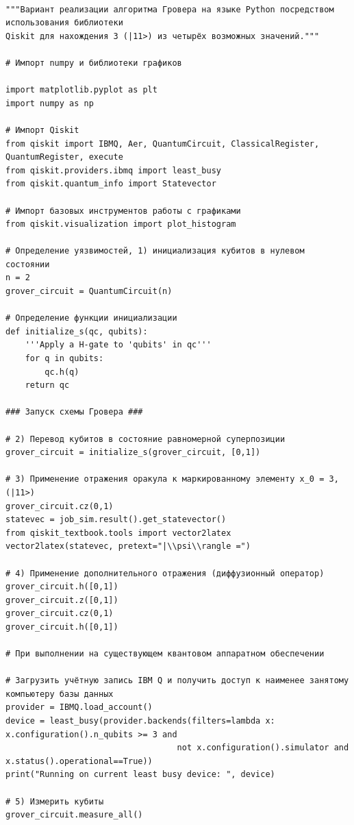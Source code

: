 \documentclass{mrl}
\begin{document}
\begin{verbatim}

"""Вариант реализации алгоритма Гровера на языке Python посредством использования библиотеки
Qiskit для нахождения 3 (|11>) из четырёх возможных значений."""

# Импорт numpy и библиотеки графиков

import matplotlib.pyplot as plt
import numpy as np

# Импорт Qiskit
from qiskit import IBMQ, Aer, QuantumCircuit, ClassicalRegister, QuantumRegister, execute
from qiskit.providers.ibmq import least_busy
from qiskit.quantum_info import Statevector

# Импорт базовых инструментов работы с графиками
from qiskit.visualization import plot_histogram

# Определение уязвимостей, 1) инициализация кубитов в нулевом состоянии
n = 2
grover_circuit = QuantumCircuit(n)

# Определение функции инициализации
def initialize_s(qc, qubits):
    '''Apply a H-gate to 'qubits' in qc'''
    for q in qubits:
        qc.h(q)
    return qc

### Запуск схемы Гровера ###

# 2) Перевод кубитов в состояние равномерной суперпозиции
grover_circuit = initialize_s(grover_circuit, [0,1])

# 3) Применение отражения оракула к маркированному элементу x_0 = 3, (|11>) 
grover_circuit.cz(0,1)
statevec = job_sim.result().get_statevector()
from qiskit_textbook.tools import vector2latex
vector2latex(statevec, pretext="|\\psi\\rangle =")

# 4) Применение дополнительного отражения (диффузионный оператор)
grover_circuit.h([0,1])
grover_circuit.z([0,1])
grover_circuit.cz(0,1)
grover_circuit.h([0,1])

# При выполнении на существующем квантовом аппаратном обеспечении

# Загрузить учётную запись IBM Q и получить доступ к наименее занятому компьютеру базы данных
provider = IBMQ.load_account()
device = least_busy(provider.backends(filters=lambda x: x.configuration().n_qubits >= 3 and 
                                   not x.configuration().simulator and x.status().operational==True))
print("Running on current least busy device: ", device)

# 5) Измерить кубиты
grover_circuit.measure_all()


\end{verbatim}
\end{document}
